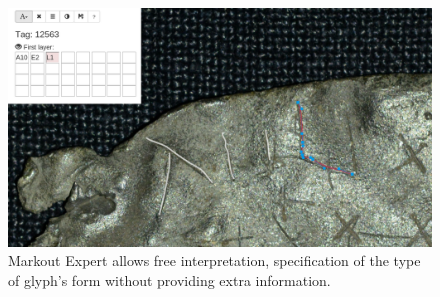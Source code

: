 \documentclass[amsthm,ebook]{saparticle}
\begin{document}
\begin{figure}[!hbp]
\centering
\includegraphics[scale=0.25]{10_expert.png}
\caption{Markout Expert allows free interpretation, specification of the type of glyph's form without providing extra information.}
\label{fig:4.1}
\end{figure}

\end{document}
